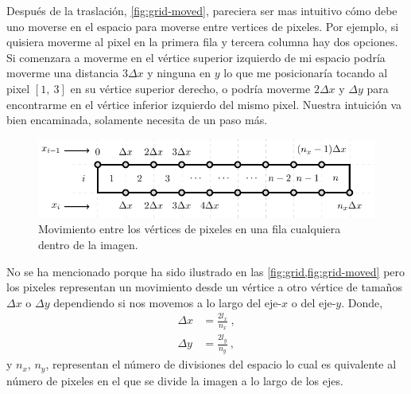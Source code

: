 Después de la traslación, \cref{fig:grid-moved}, pareciera ser mas intuitivo cómo debe uno moverse en el espacio para moverse entre vertices de pixeles. Por ejemplo, si quisiera moverme al pixel en la primera fila y tercera columna hay dos opciones. Si comenzara a moverme en el vértice superior izquierdo de mi espacio podría moverme una distancia $3 \Delta x$ y ninguna en $y$ lo que me posicionaría tocando al pixel $[1,\ 3]$ en su vértice superior derecho, o podría moverme $2 \Delta x$ y $\Delta y$ para encontrarme en el vértice inferior izquierdo del mismo pixel. Nuestra intuición va bien encaminada, solamente necesita de un paso más.
\begin{figure}[ht!]
    \centering
    \includegraphics[scale=0.8]{../figures/small-grid/small-grid}
    \caption{Movimiento entre los vértices de pixeles en una fila cualquiera dentro de la imagen.}
    \label{fig:small-grid}
\end{figure}

No se ha mencionado porque ha sido ilustrado en las \cref{fig:grid,fig:grid-moved} pero los pixeles representan un movimiento desde un vértice a otro vértice de tamaños $\Delta x$ o $\Delta y$ dependiendo si nos movemos a lo largo del eje-$x$ o del eje-$y$. Donde,
\begin{equation*}
    \begin{split}
        \Delta x & = \frac{2 l_x}{n_x}\ , \\
        \Delta y & = \frac{2 l_y}{n_y}\ ,
    \end{split}
\end{equation*}
y $n_x$, $n_y$, representan el número de divisiones del espacio lo cual es quivalente al número de pixeles en el que se divide la imagen a lo largo de los ejes.

